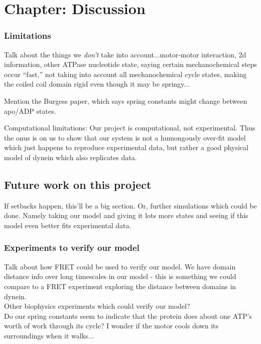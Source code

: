 \documentclass[10pt]{article} %
\begin{document}
\section{Chapter: Discussion}
\subsubsection{Limitations}
Talk about the things we \textit{don't} take into account...motor-motor interaction, 2d information,
other ATPase nucleotide state, saying certain mechanochemical steps occur ``fast,'' not taking into
account all mechanochemical cycle states, making the coiled coil domain rigid even though it may be
springy...

Mention the Burgess paper, which says spring constants might change between apo/ADP states.

Computational limitations: Our project is computational, not experimental. Thus the onus is on us to show that our system is not a humongously over-fit model which just happens to reproduce experimental data, but rather a good physical model of dynein which also replicates data.\\

\subsection{Future work on this project}
If setbacks happen, this'll be a big section. Or, further simulations which could be done. Namely taking our model and giving it lots more states and seeing if this model even better fits experimental data.\\

\subsubsection{Experiments to verify our model}
Talk about how FRET could be used to verify our model. We have domain distance info over long
timescales in our model - this is something we could compare to a FRET experiment exploring
the distance between domains in dynein.\\

Other biophysics experiments which could verify our model?\\

Do our spring constants seem to indicate that the protein does about one ATP's worth of work through its cycle? I wonder if the motor cools down its surroundings when it walks...\\
\end{document}
